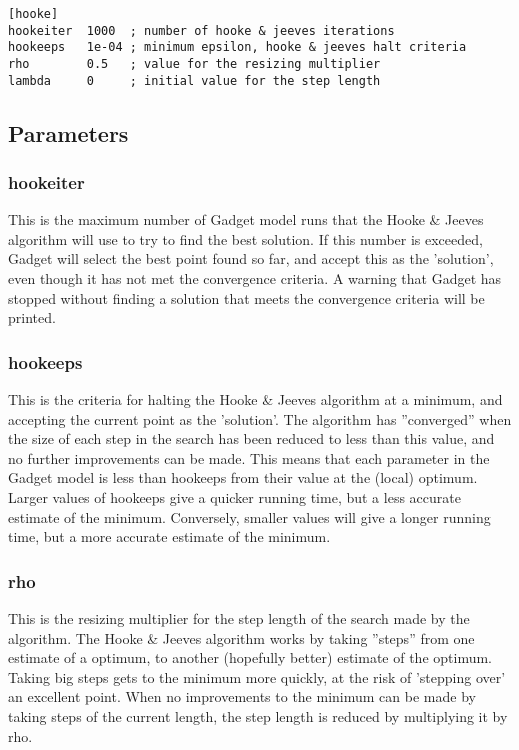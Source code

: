 \documentclass [a4paper, 10pt]{book}
\begin{document}
{\small\begin{verbatim}
[hooke]
hookeiter  1000  ; number of hooke & jeeves iterations
hookeeps   1e-04 ; minimum epsilon, hooke & jeeves halt criteria
rho        0.5   ; value for the resizing multiplier
lambda     0     ; initial value for the step length
\end{verbatim}}

\subsection{Parameters}\label{subsec:hookepar}
\subsubsection{hookeiter}
This is the maximum number of Gadget model runs that the Hooke \& Jeeves algorithm will use to try to find the best solution.  If this number is exceeded, Gadget will select the best point found so far, and accept this as the 'solution', even though it has not met the convergence criteria.  A warning that Gadget has stopped without finding a solution that meets the convergence criteria will be printed.

\subsubsection{hookeeps}
This is the criteria for halting the Hooke \& Jeeves algorithm at a minimum, and accepting the current point as the 'solution'.  The algorithm has ''converged'' when the size of each step in the search has been reduced to less than this value, and no further improvements can be made.  This means that each parameter in the Gadget model is less than hookeeps from their value at the (local) optimum.  Larger values of hookeeps give a quicker running time, but a less accurate estimate of the minimum.  Conversely, smaller values will give a longer running time, but a more accurate estimate of the minimum.

\subsubsection{rho}
This is the resizing multiplier for the step length of the search made by the algorithm.  The Hooke \& Jeeves algorithm works by taking ''steps'' from one estimate of a optimum, to another (hopefully better) estimate of the optimum.  Taking big steps gets to the minimum more quickly, at the risk of 'stepping over' an excellent point.  When no improvements to the minimum can be made by taking steps of the current length, the step length is reduced by multiplying it by rho.
\end{document}
